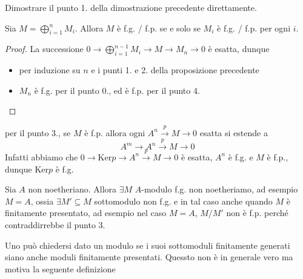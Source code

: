 \begin{eser}{}
    Dimostrare il punto 1. della dimostrazione precedente direttamente.
\end{eser}
\begin{corollary}{}
    Sia \(M = \bigoplus_{i=1}^{n} M_i \). Allora \(M\) è f.g. / f.p. se e solo
    se \(M_{i} \) è f.g. / f.p. per ogni \(i\).
\end{corollary}
\begin{proof}{}
    La successione \(0 \to \bigoplus_{i=1} ^{n-1}M_i \to M \to M_{n} \to 0\) è
    esatta, dunque
    \begin{itemize}
        \item[\(\impliedby  \)] per induzione su \(n\) e i punti 1. e 2. della
            proposizione precedente
        \item[\(\implies \)] \(M_n\) è f.g. per il punto 0., ed è f.p. per il
            punto 4.
    \end{itemize}
\end{proof}
\begin{remark}{}
    per il punto 3., se \(M\) è f.p. allora ogni \(A^{n} \overset{p}{\to } M \to 0\) esatta si estende a 
    \[
      A^{m} \to A^{n} \overset{p}{\to } M \to 0
    \]
    Infatti abbiamo che \(0 \to \mathrm{Ker}p \to A^{n} \overset{p}{\to} M \to
    0\) è esatta, \(A^{n}\) è f.g. e \(M\) è f.p., dunque \(\mathrm{Ker}p\) è f.g.
\end{remark}

\begin{remark}{}
    Sia \(A\) non noetheriano. Allora \(\exists M\) \(A\)-modulo f.g. non
    noetheriamo, ad esempio \(M = A\), ossia \(\exists  M' \subseteq M \)
    sottomodulo non f.g. e in tal caso anche quando \(M\) è finitamente
    presentato, ad esempio nel caso \(M=A\), \(M/M'\) non è f.p. perché
    contraddirrebbe il punto 3.
\end{remark}

Uno può chiedersi dato un modulo se i suoi sottomoduli finitamente generati
siano anche moduli finitamente presentati. Quessto non è in generale vero ma
motiva la seguente definizione

